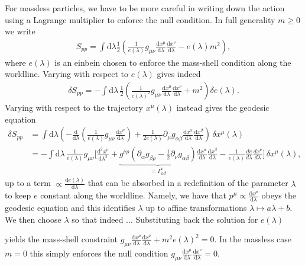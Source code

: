 {\begin{mytheorem}
For massless particles, we have to be more careful in writing down the action using a Lagrange multiplier to enforce the null condition.
In full generality $m\geq 0$ we write
\begin{align}
    S_{pp} = \int \mathrm{d}\lambda \frac{1}{2}\left( \frac{1}{e(\lambda)} g_{\mu\nu} \frac{\mathrm{d}x^\mu}{\mathrm{d}\lambda} \frac{\mathrm{d}x^\nu}{\mathrm{d}\lambda} - e(\lambda) m^2 \right),
\end{align}
where $e(\lambda)$ is an einbein chosen to enforce the mass-shell condition along the worldline.
Varying with respect to $e(\lambda)$ gives indeed
{\small
\begin{align}
    \delta S_{pp} = -\int \mathrm{d}\lambda \, \frac{1}{2} \left( \frac{1}{e(\lambda)^2} g_{\mu\nu} \frac{\mathrm{d}x^\mu}{\mathrm{d}\lambda} \frac{\mathrm{d}x^\nu}{\mathrm{d}\lambda} + m^2 \right) \delta e(\lambda).
\end{align}
}
Varying with respect to the trajectory $x^\mu(\lambda)$ instead gives the geodesic equation
{\small
\begin{align}
    \delta S_{pp} &= \int \mathrm{d}\lambda  \left( - \frac{\mathrm{d}}{\mathrm{d}\lambda} \left( \frac{1}{e(\lambda)} g_{\mu\nu} \frac{\mathrm{d}x^\nu}{\mathrm{d}\lambda} \right) + \frac{1}{2 e(\lambda)} \partial_\mu g_{\alpha\beta} \frac{\mathrm{d}x^\alpha}{\mathrm{d}\lambda} \frac{\mathrm{d}x^\beta}{\mathrm{d}\lambda} \right)\, \delta x^\mu(\lambda)
    \\
    &=-\int \mathrm{d}\lambda \,\frac{1}{e(\lambda)} g_{\mu\nu}\Bigg[ \frac{\mathrm{d}^2 x^\nu}{\mathrm{d}\lambda^2}  + \underbrace{g^{\nu\rho}\left(\partial_\alpha g_{\beta\rho}-\frac{1}{2} \partial_\nu g_{\alpha\beta} \right)}_{=\Gamma_{\alpha\beta}^\nu} \frac{\mathrm{d}x^\alpha}{\mathrm{d}\lambda} \frac{\mathrm{d}x^\beta}{\mathrm{d}\lambda}-\frac{1}{e(\lambda)}\frac{de}{d\lambda}\frac{d x^\nu}{d\lambda}\Bigg]\, \delta x^\mu(\lambda),
\end{align}
}
up to a term $\propto \frac{\mathrm{d}e(\lambda)}{\mathrm{d}\lambda}$ that can be absorbed in a redefinition of the parameter $\lambda$ to keep $e$ constant along the worldline.
Namely, we have that $p^\mu \propto \frac{\mathrm{d}x^\mu}{\mathrm{d}\lambda}$ obeys the geodesic equation and this identifies $\lambda$ up to affine transformations $\lambda \mapsto a \lambda + b$.
We then choose $\lambda$ so that indeed ...
Substituting back the solution for $e(\lambda)$

yields the mass-shell constraint $g_{\mu\nu} \frac{\mathrm{d}x^\mu}{\mathrm{d}\lambda} \frac{\mathrm{d}x^\nu}{\mathrm{d}\lambda} + m^2 e(\lambda)^2 =0$.
In the massless case $m=0$ this simply enforces the null condition $g_{\mu\nu} \frac{\mathrm{d}x^\mu}{\mathrm{d}\lambda} \frac{\mathrm{d}x^\nu}{\mathrm{d}\lambda} =0$. 
\end{mytheorem}

}

